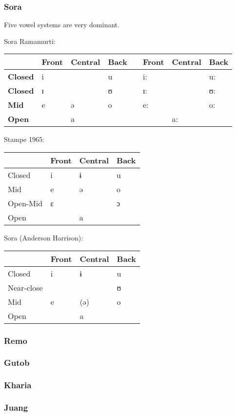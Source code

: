 \documentclass[a4paper,]{article}
\begin{document}
\subsubsection{Sora}\label{sora}

Five vowel systems are very dominant.

Sora Ramamurti:

\begin{longtable}[]{@{}llllllll@{}}
\toprule
& Front & Central & Back & & Front & Central & Back\tabularnewline
\midrule
\endhead
\textbf{Closed} & i & & u & & i: & & u:\tabularnewline
\textbf{Closed} & ɪ & & ʊ & & ɪ: & & ʊ:\tabularnewline
\textbf{Mid} & e & ə & o & & e: & & o:\tabularnewline
\textbf{Open} & & a & & & & a: &\tabularnewline
\bottomrule
\end{longtable}

Stampe 1965:

\begin{longtable}[]{@{}llll@{}}
\toprule
& Front & Central & Back\tabularnewline
\midrule
\endhead
Closed & i & ɨ & u\tabularnewline
Mid & e & ə & o\tabularnewline
Open-Mid & ɛ & & ɔ\tabularnewline
Open & & a &\tabularnewline
\bottomrule
\end{longtable}

Sora (Anderson Harrison):

\begin{longtable}[]{@{}llll@{}}
\toprule
& Front & Central & Back\tabularnewline
\midrule
\endhead
Closed & i & ɨ & u\tabularnewline
Near-close & & & ʊ\tabularnewline
Mid & e & (ə) & o\tabularnewline
Open & & a &\tabularnewline
\bottomrule
\end{longtable}

\subsubsection{Remo}\label{remo}

\subsubsection{Gutob}\label{gutob}

\subsubsection{Kharia}\label{kharia}

\subsubsection{Juang}\label{juang}
\end{document}
